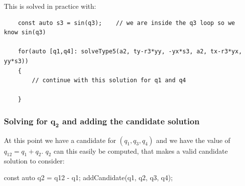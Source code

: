 \documentclass{ecnreport}
\begin{document}
    This is solved in practice with:
    \begin{center}
    \cppstyle \raggedright
    \begin{lstlisting}
    const auto s3 = sin(q3);    // we are inside the q3 loop so we know sin(q3)
    
    for(auto [q1,q4]: solveType5(a2, ty-r3*yy, -yx*s3, a2, tx-r3*yx, yy*s3))
    {
        // continue with this solution for q1 and q4
    
    }
    \end{lstlisting}
\end{center}


\subsubsection*{Solving for $\mathbf{q_2}$ and adding the candidate solution}

At this point we have a candidate for $(q_1,q_3,q_4)$ and we have the value of $q_{12}=q_1+q_2$.
$q_2$ can this easily be computed, that makes a valid candidate solution to consider:

\begin{cppcode}
 const auto q2 = q12 - q1;
 addCandidate({q1, q2, q3, q4});
\end{cppcode}

%
%
\end{document}
